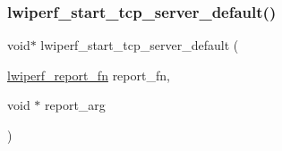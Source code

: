 \subsubsection{\texorpdfstring{lwiperf\+\_\+start\+\_\+tcp\+\_\+server\+\_\+default()}{lwiperf\_start\_tcp\_server\_default()}}
{\footnotesize\ttfamily void$\ast$ lwiperf\+\_\+start\+\_\+tcp\+\_\+server\+\_\+default (\begin{DoxyParamCaption}\item[{\hyperlink{openmote-cc2538_2lwip_2src_2include_2lwip_2apps_2lwiperf_8h_a248ea47a58a14c6aecf6525217a812fd}{lwiperf\+\_\+report\+\_\+fn}}]{report\+\_\+fn,  }\item[{void $\ast$}]{report\+\_\+arg }\end{DoxyParamCaption})}

